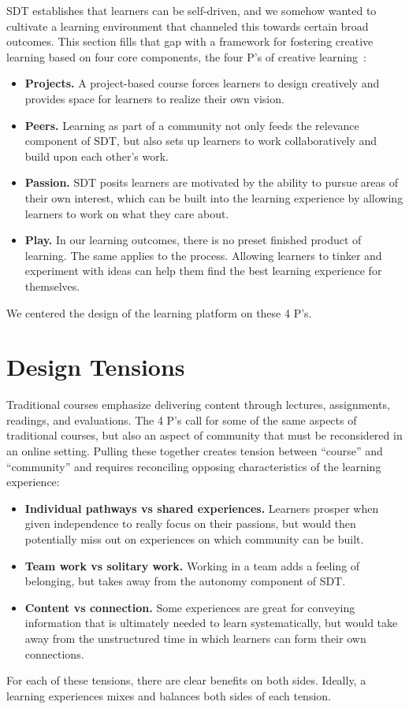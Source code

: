 \documentclass[12pt,twoside]{mitthesis}
\begin{document}
SDT establishes that learners can be self-driven, and we somehow wanted to cultivate a learning environment that channeled this towards certain broad outcomes. This section fills that gap with a framework for fostering creative learning based on four core components, the four P's of creative learning~\cite{cultivating}\cite{resnick2014give}\cite{creativelearningfuturework}:
\begin{itemize}
\item \textbf{Projects.} A project-based course forces learners to design creatively and provides space for learners to realize their own vision.
\item \textbf{Peers.} Learning as part of a community not only feeds the relevance component of SDT, but also sets up learners to work collaboratively and build upon each other's work.
\item \textbf{Passion.} SDT posits learners are motivated by the ability to pursue areas of their own interest, which can be built into the learning experience by allowing learners to work on what they care about.
\item \textbf{Play.} In our learning outcomes, there is no preset finished product of learning. The same applies to the process. Allowing learners to tinker and experiment with ideas can help them find the best learning experience for themselves.
\end{itemize}
We centered the design of the learning platform on these 4 P's.

\section{Design Tensions}

Traditional courses emphasize delivering content through lectures, assignments, readings, and evaluations. The 4 P's call for some of the same aspects of traditional courses, but also an aspect of community that must be reconsidered in an online setting. Pulling these together creates tension between ``course'' and ``community'' and requires reconciling opposing characteristics of the learning experience:
\begin{itemize}
\item \textbf{Individual pathways vs shared experiences.} Learners prosper when given independence to really focus on their passions, but would then potentially miss out on experiences on which community can be built. 
\item \textbf{Team work vs solitary work.} Working in a team adds a feeling of belonging, but takes away from the autonomy component of SDT.
\item \textbf{Content vs connection.} Some experiences are great for conveying information that is ultimately needed to learn systematically, but would take away from the unstructured time in which learners can form their own connections.
\end{itemize} 
For each of these tensions, there are clear benefits on both sides. Ideally, a learning experiences mixes and balances both sides of each tension.~\cite{learningcreativelearning} 
\end{document}
